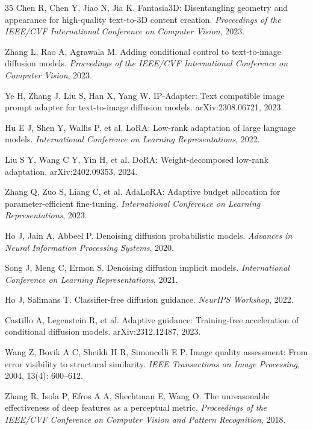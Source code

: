 \documentclass[times,twocolumn,final]{elsarticle}
\begin{document}
\begin{thebibliography}{35}
Chen R, Chen Y, Jiao N, Jia K. Fantasia3D: Disentangling geometry and appearance for high-quality text-to-3D content creation. \textit{Proceedings of the IEEE/CVF International Conference on Computer Vision}, 2023.

Zhang L, Rao A, Agrawala M. Adding conditional control to text-to-image diffusion models. \textit{Proceedings of the IEEE/CVF International Conference on Computer Vision}, 2023.

Ye H, Zhang J, Liu S, Han X, Yang W. IP-Adapter: Text compatible image prompt adapter for text-to-image diffusion models. arXiv:2308.06721, 2023.


Hu E J, Shen Y, Wallis P, et al. LoRA: Low-rank adaptation of large language models. \textit{International Conference on Learning Representations}, 2022.

Liu S Y, Wang C Y, Yin H, et al. DoRA: Weight-decomposed low-rank adaptation. arXiv:2402.09353, 2024.

Zhang Q, Zuo S, Liang C, et al. AdaLoRA: Adaptive budget allocation for parameter-efficient fine-tuning. \textit{International Conference on Learning Representations}, 2023.

Ho J, Jain A, Abbeel P. Denoising diffusion probabilistic models. \textit{Advances in Neural Information Processing Systems}, 2020.

Song J, Meng C, Ermon S. Denoising diffusion implicit models. \textit{International Conference on Learning Representations}, 2021.

Ho J, Salimans T. Classifier-free diffusion guidance. \textit{NeurIPS Workshop}, 2022.

Castillo A, Legenstein R, et al. Adaptive guidance: Training-free acceleration of conditional diffusion models. arXiv:2312.12487, 2023.

Wang Z, Bovik A C, Sheikh H R, Simoncelli E P. Image quality assessment: From error visibility to structural similarity. \textit{IEEE Transactions on Image Processing}, 2004, 13(4): 600--612.


Zhang R, Isola P, Efros A A, Shechtman E, Wang O. The unreasonable effectiveness of deep features as a perceptual metric. \textit{Proceedings of the IEEE/CVF Conference on Computer Vision and Pattern Recognition}, 2018.


\end{thebibliography}
\end{document}
